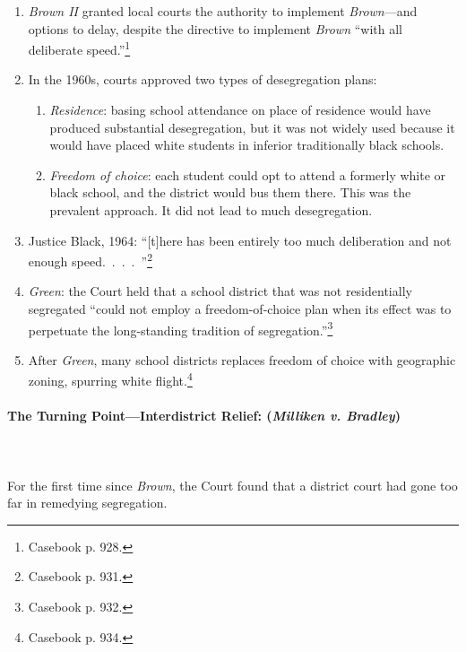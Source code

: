 \begin{enumerate}
    \item \emph{Brown II} granted local courts the authority to implement 
    \emph{Brown}---and options to delay, despite the directive to implement 
    \emph{Brown} ``with all deliberate speed.''\footnote{Casebook p. 928.}
    \item In the 1960s, courts approved two types of desegregation plans:
    \begin{enumerate}
        \item \emph{Residence}: basing school attendance on place of residence 
        would have produced substantial desegregation, but it was not widely 
        used because it would have placed white students in inferior 
        traditionally black schools.
        \item \emph{Freedom of choice}: each student could opt to attend a 
        formerly white or black school, and the district would bus them there. 
        This was the prevalent approach. It did not lead to much 
        desegregation.
    \end{enumerate}
    \item Justice Black, 1964: ``[t]here has been entirely too much 
    deliberation and not enough speed.~.~.~.~''\footnote{Casebook p. 931.}
    \item \emph{Green}: the Court held that a school district that was not 
    residentially segregated ``could not employ a freedom-of-choice plan when 
    its effect was to perpetuate the long-standing tradition of 
    segregation.''\footnote{Casebook p. 932.}
    \item After \emph{Green}, many school districts replaces freedom of choice 
    with geographic zoning, spurring white flight.\footnote{Casebook p. 934.}
\end{enumerate}

\paragraph{The Turning Point---Interdistrict Relief: (\emph{Milliken v.  
Bradley})}
~\\\\
For the first time since \emph{Brown}, the Court found that a district court
had gone too far in remedying segregation.

